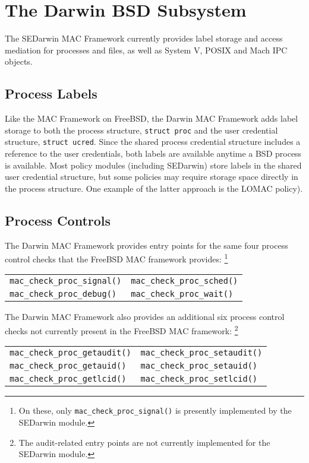\section{The Darwin BSD Subsystem}

The SEDarwin MAC Framework currently provides label storage and
access mediation for processes and files, as well as System V, POSIX
and Mach IPC objects.

\subsection{Process Labels}

Like the MAC Framework on FreeBSD, the Darwin MAC Framework adds label
storage to both the process structure, {\tt struct proc} and the user
credential structure, {\tt struct ucred}.  Since the shared process
credential structure includes a reference to the user credentials,
both labels are available anytime a BSD process is available.  Most
policy modules (including SEDarwin) store labels in the shared user
credential structure, but some policies may require storage space
directly in the process structure.  One example of the latter
approach is the LOMAC policy\cite{Fraser00,fraser01}).

\subsection{Process Controls}

The Darwin MAC Framework provides entry points for the same four process
control checks that the FreeBSD MAC framework provides:
\footnote{On these, only {\tt mac\_check\_proc\_signal()} is presently
implemented by the SEDarwin module.}

\begin{center}
\begin{tabular}{ll}
{\tt mac\_check\_proc\_signal()} & {\tt mac\_check\_proc\_sched()} \\
{\tt mac\_check\_proc\_debug()} & {\tt mac\_check\_proc\_wait()} \\
\end{tabular}
\end{center}

The Darwin MAC Framework also provides an additional six process
control checks not currently present in the FreeBSD MAC framework:
\footnote{The audit-related entry points are not currently
implemented for the SEDarwin module.}

\begin{center}
\begin{tabular}{ll}
{\tt mac\_check\_proc\_getaudit()} & {\tt mac\_check\_proc\_setaudit()} \\
{\tt mac\_check\_proc\_getauid()} & {\tt mac\_check\_proc\_setauid()} \\
{\tt mac\_check\_proc\_getlcid()} & {\tt mac\_check\_proc\_setlcid()} \\
\end{tabular}
\end{center}

